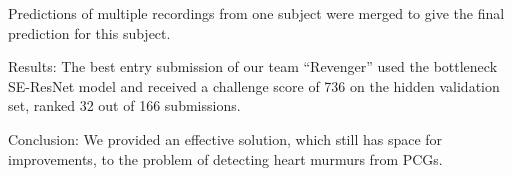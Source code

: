 \documentclass{cinc-abstract}
\begin{document}
Predictions of multiple recordings from one subject were merged to give the final prediction for this subject.

Results: The best entry submission of our team ``Revenger'' used the bottleneck SE-ResNet model and received a challenge score of 736 on the hidden validation set, ranked 32 out of 166 submissions.

Conclusion: We provided an effective solution, which still has space for improvements, to the problem of detecting heart murmurs from PCGs.
\end{document}
